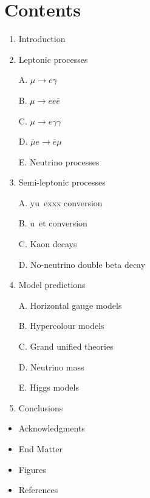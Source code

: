\documentclass[twoside]{article}
\begin{document}
\section*{Contents}


\begin{enumerate}
\item Introduction

\item  Leptonic processes


A. $\mu \rightarrow e\gamma$

B.  $\mu \rightarrow ee\overline{e}$

C. $\mu \rightarrow e\gamma\gamma$

D. $\overline{\mu}e \rightarrow \overline{e}\mu$

E. Neutrino processes

\item  Semi-leptonic processes

A. yu~exxx conversion

B. u~et conversion

C. Kaon decays

D. No-neutrino double beta decay

\item  Model predictions

A. Horizontal gauge models

B. Hypercolour models

C. Grand unified theories

D. Neutrino mass

E. Higgs models

\item Conclusions
\end{enumerate}

\begin{itemize}
\item Acknowledgments


\item End Matter

\item Figures
\item References
\end{itemize}
\end{document}
